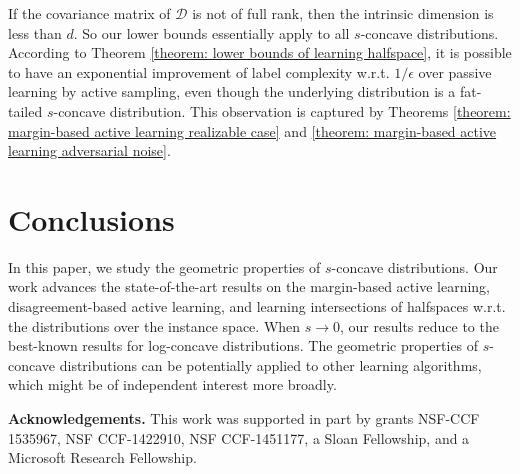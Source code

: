 \documentclass[11pt]{article}
\newcommand{\cD}{\mathcal{D}}
\begin{document}
If the covariance matrix of $\cD$ is not of full rank, then the intrinsic dimension is less than $d$. So our lower bounds essentially apply to all $s$-concave distributions. According to Theorem \ref{theorem: lower bounds of learning halfspace}, it is possible to have an exponential improvement of label complexity w.r.t. $1/\epsilon$ over passive learning by active sampling, even though the underlying distribution is a fat-tailed $s$-concave distribution. This observation is captured by Theorems \ref{theorem: margin-based active learning realizable case} and \ref{theorem: margin-based active learning adversarial noise}.



\section{Conclusions}

In this paper, we study the geometric properties of $s$-concave distributions. Our work advances the state-of-the-art results on the margin-based active learning, disagreement-based active learning, and learning intersections of halfspaces w.r.t. the distributions over the instance space. When $s\rightarrow 0$, our results reduce to the best-known results for log-concave distributions. The geometric properties of $s$-concave distributions can be potentially applied to other learning algorithms, which might be of independent interest more broadly.

\medskip
\noindent \textbf{Acknowledgements.} This work was supported in part by grants  NSF-CCF 1535967, NSF CCF-1422910, NSF CCF-1451177, a Sloan Fellowship, and a Microsoft Research
Fellowship.





\newpage
\appendix
\end{document}
